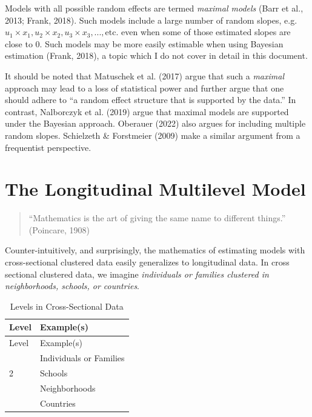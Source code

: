 \documentclass[
  letterpaper,
  DIV=11,
  numbers=noendperiod]{scrreprt}
\begin{document}
Models with all possible random effects are termed \emph{maximal models}
(Barr et al., 2013; Frank, 2018). Such models include a large number of
random slopes,
e.g.~\(u_1 \times x_1, u_2 \times x_2, u_3 \times x_3, ..., \text{etc.}\)
even when some of those estimated slopes are close to 0. Such models may
be more easily estimable when using Bayesian estimation (Frank, 2018), a
topic which I do not cover in detail in this document.

It should be noted that Matuschek et al. (2017) argue that such a
\emph{maximal} approach may lead to a loss of statistical power and
further argue that one should adhere to ``a random effect structure that
is supported by the data.'' In contrast, Nalborczyk et al. (2019) argue
that maximal models are supported under the Bayesian approach. Oberauer
(2022) also argues for including multiple random slopes. Schielzeth \&
Forstmeier (2009) make a similar argument from a frequentist
perspective.


\hypertarget{the-longitudinal-multilevel-model}{%
\chapter{The Longitudinal Multilevel
Model}\label{the-longitudinal-multilevel-model}}

\begin{quote}
``Mathematics is the art of giving the same name to different things.''
(Poincare, 1908)
\end{quote}

Counter-intuitively, and surprisingly, the mathematics of estimating
models with cross-sectional clustered data easily generalizes to
longitudinal data. In cross sectional clustered data, we imagine
\emph{individuals or families clustered in neighborhoods, schools, or
countries}.

\hypertarget{tbl-levelscrosssectional}{}
\begin{longtable}[]{@{}ll@{}}
\caption{\label{tbl-levelscrosssectional}Levels in Cross-Sectional
Data}\tabularnewline
\toprule\noalign{}
Level & Example(s) \\
\midrule\noalign{}
\endfirsthead
\toprule\noalign{}
Level & Example(s) \\
\midrule\noalign{}
\endhead
\bottomrule\noalign{}
\endlastfoot
1 & Individuals or Families \\
2 & Schools \\
& Neighborhoods \\
& Countries \\
\end{longtable}
\end{document}
